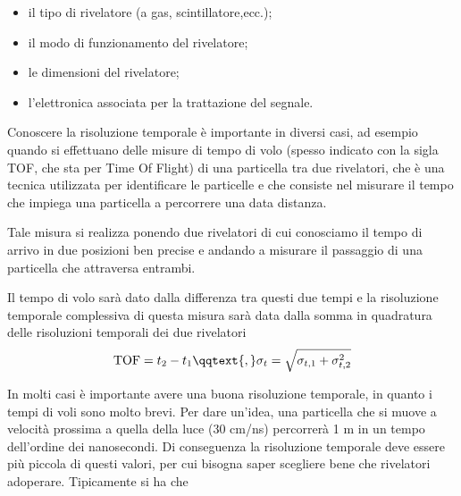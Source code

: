 \begin{itemize}
   \item il tipo di rivelatore (a gas, scintillatore,ecc.);
   \item il modo di funzionamento del rivelatore;
   \item le dimensioni del rivelatore;
   \item l'elettronica associata per la trattazione del segnale.
\end{itemize}

\begin{esempio}
   Conoscere la risoluzione temporale è importante in diversi casi, ad esempio quando si effettuano delle misure di tempo di volo (spesso indicato con la sigla TOF, che sta per Time Of Flight) di una particella tra due rivelatori, che è una tecnica utilizzata per identificare le particelle e che consiste nel misurare il tempo che impiega una particella a percorrere una data distanza.

   Tale misura si realizza ponendo due rivelatori di cui conosciamo il tempo di arrivo in due posizioni ben precise e andando a misurare il passaggio di una particella che attraversa entrambi.
   \begin{figure}[H]
      \centering
   \end{figure}
   Il tempo di volo sarà dato dalla differenza tra questi due tempi e la risoluzione temporale complessiva di questa misura sarà data dalla somma in quadratura delle risoluzioni temporali dei due rivelatori
   \begin{equation*}
      \text{TOF}=t_2 - t_1
      \qqtext{,}
      \sigma_t=\sqrt{\sigma_{t,1} + \sigma_{t,2}^2}
   \end{equation*}
\end{esempio}

In molti casi è importante avere una buona risoluzione temporale, in quanto i tempi di voli sono molto brevi. Per dare un'idea, una particella che si muove a velocità prossima a quella della luce (30 cm/ns) percorrerà 1 m in un tempo dell'ordine dei nanosecondi. Di conseguenza la risoluzione temporale deve essere più piccola di questi valori, per cui bisogna saper scegliere bene che rivelatori adoperare. Tipicamente si ha che

